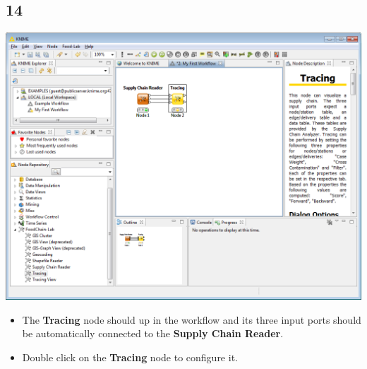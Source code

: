 \documentclass{beamer}
\begin{document}
\subsection{14}
\begin{frame}
	\begin{center}
  		\includegraphics[height=0.6\textheight]{14.png}
	\end{center}
	\begin{itemize}
		\item The \textbf{Tracing} node should up in the workflow and its three input ports should be automatically connected to the \textbf{Supply Chain Reader}.
		\item Double click on the \textbf{Tracing} node to configure it.
	\end{itemize}
\end{frame}
\end{document}
